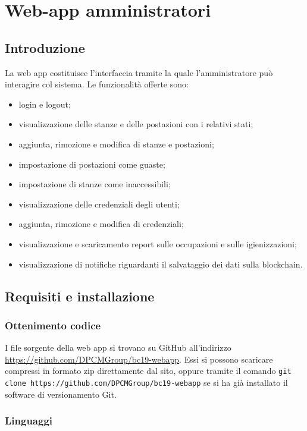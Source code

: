 \section{Web-app amministratori}
\subsection{Introduzione}
La web app costituisce l'interfaccia tramite la quale l'amministratore può interagire col sistema.
Le funzionalità offerte sono:
\begin{itemize}
	\item login e logout;
	\item visualizzazione delle stanze e delle postazioni con i relativi stati;
	\item aggiunta, rimozione e modifica di stanze e postazioni;
	\item impostazione di postazioni come guaste;
	\item impostazione di stanze come inaccessibili;
	\item visualizzazione delle credenziali degli utenti;
	\item aggiunta, rimozione e modifica di credenziali;
	\item visualizzazione e scaricamento report sulle occupazioni e sulle igienizzazioni;
	\item visualizzazione di notifiche riguardanti il salvataggio dei dati sulla blockchain.
\end{itemize}

\subsection{Requisiti e installazione}

\subsubsection{Ottenimento codice}
I file sorgente della web app si trovano su GitHub all'indirizzo \url{https://github.com/DPCMGroup/bc19-webapp}. Essi si possono scaricare compressi in formato zip direttamente dal sito, oppure tramite il comando \newline
\texttt{git clone https://github.com/DPCMGroup/bc19-webapp} \newline
se si ha già installato il software di versionamento Git.

\subsubsection{Linguaggi}
